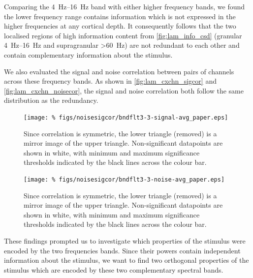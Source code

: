 Comparing the \SIrange{4}{16}{Hz} band with either higher frequency bands, we found the lower frequency range contains information which is not expressed in the higher frequencies at any cortical depth.
It consequently follows that the two localised regions of high information content from \autoref{fig:lam_info_csd} (granular \SIrange{4}{16}{Hz} and supragranular \SI{>60}{Hz}) are not redundant to each other and contain complementary information about the stimulus.

We also evaluated the signal and noise correlation between pairs of channels across these frequency bands.
As shown in \autoref{fig:lam_cxchn_sigcor} and \autoref{fig:lam_cxchn_noisecor}, the signal and noise correlation both follow the same distribution as the redundancy.

\begin{figure}[htbp]
    \centering
    \texttt{[image: \%
figs/noisesigcor/bndflt3-3-signal-avg\_paper.eps]}
%
\caption{
Since correlation is symmetric, the lower triangle (removed) is a mirror image of the upper triangle.
Non-significant datapoints are shown in white, with minimum and maximum significance thresholds indicated by the black lines across the colour bar.
}%
\label{fig:lam_cxchn_cor}
\label{fig:lam_cxchn_sigcor}
%
\end{figure}

\begin{figure}[htbp]
    \centering
    \texttt{[image: \%
figs/noisesigcor/bndflt3-3-noise-avg\_paper.eps]}
%
\caption{
Since correlation is symmetric, the lower triangle (removed) is a mirror image of the upper triangle.
Non-significant datapoints are shown in white, with minimum and maximum significance thresholds indicated by the black lines across the colour bar.
}%
\label{fig:lam_cxchn_noisecor}
%
\end{figure}

These findings prompted us to investigate which properties of the stimulus were encoded by the two frequencies bands.
Since their powers contain independent information about the stimulus, we want to find two orthogonal properties of the stimulus which are encoded by these two complementary spectral bands.


